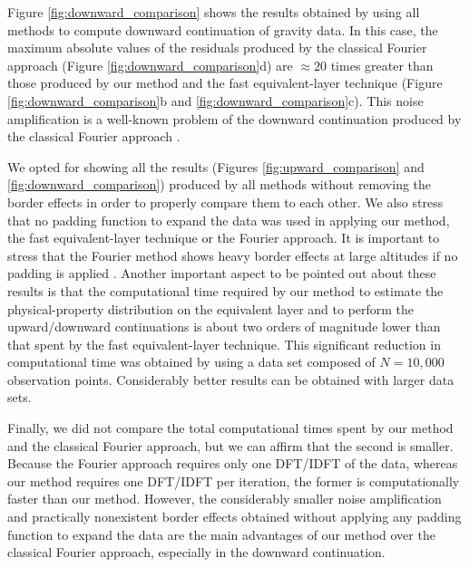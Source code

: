 Figure \ref{fig:downward_comparison} shows the results obtained by using all 
methods to compute downward continuation of gravity data.
In this case, the maximum absolute values of the residuals produced by the 
classical Fourier approach (Figure \ref{fig:downward_comparison}d) are 
$\approx 20$ times greater than those produced by our method and the fast equivalent-layer technique (Figure \ref{fig:downward_comparison}b and \ref{fig:downward_comparison}c).
This noise amplification is a well-known problem of the downward continuation 
produced by the classical Fourier approach \citep[e.g., ][ p. 320]{blakely1996}.

We opted for showing all the results (Figures \ref{fig:upward_comparison} and 
\ref{fig:downward_comparison}) produced by all methods without removing the border 
effects in order to properly compare them to each other.
We also stress that no padding function to expand the data was used in applying 
our method, the fast equivalent-layer technique or the Fourier approach.
It is important to stress that the Fourier method shows heavy border effects at large 
altitudes if no padding is applied \citep{baniamerian_etal2017}. 
Another important aspect to be pointed out about these results 
is that the computational time required by our method to estimate the physical-property 
distribution on the equivalent layer and to perform the upward/downward continuations 
is about two orders of magnitude lower than that spent by the fast equivalent-layer technique.
This significant reduction in computational time was obtained by using a data set 
composed of $N = 10,000$ observation points. Considerably better results can be 
obtained with larger data sets.

Finally, we did not compare the total computational times spent by our method 
and the classical Fourier approach, but we can affirm that the second is smaller. 
Because  the Fourier approach requires only one DFT/IDFT of the data, whereas 
our method requires one DFT/IDFT per iteration, the former is computationally faster 
than our method.
However, the considerably smaller noise amplification and practically nonexistent 
border effects obtained without applying any padding function to expand 
the data are the main advantages of our method over the classical Fourier 
approach, especially in the downward continuation. 
